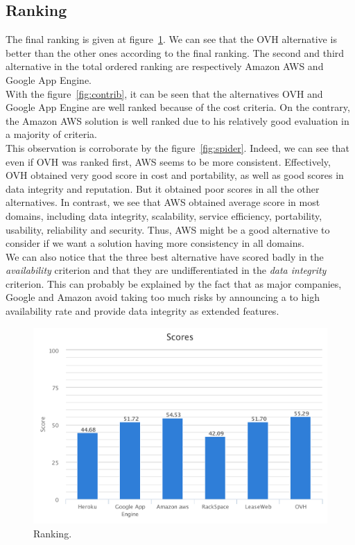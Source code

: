 \documentclass[a4paper,11pt]{article}
\begin{document}
\subsection{Ranking}
The final ranking is given at figure~\ref{fig:ranking}. We can see that the OVH alternative is better than the other ones according to the final ranking. The second and third alternative in the total ordered ranking are respectively Amazon AWS and Google App Engine.\\

With the figure~\ref{fig:contrib}, it can be seen that the alternatives OVH and Google App Engine are well ranked because of the cost criteria. On the contrary, the Amazon AWS solution is well ranked due to his relatively good evaluation in a majority of criteria.\\
This observation is corroborate by the figure~\ref{fig:spider}. Indeed, we can see that even if OVH was ranked first, AWS seems to be more consistent. Effectively, OVH obtained very good score in cost and portability, as well as good scores in data integrity and reputation. But it obtained poor scores in all the other alternatives. In contrast, we see that AWS obtained average score in most domains, including data integrity, scalability, service efficiency, portability, usability, reliability and security. Thus, AWS might be a good alternative to consider if we want a solution having more consistency in all domains.\\

We can also notice that the three best alternative have scored badly in the \emph{availability} criterion and that they are undifferentiated in the \emph{data integrity} criterion. This can probably be explained by the fact that as major companies, Google and Amazon avoid taking too much risks by announcing a to high availability rate and provide data integrity as extended features.\\

\begin{figure}[h]
  \center
  \includegraphics[width=\textwidth-5cm]{img/Result/ranking.pdf}
  \caption{Ranking.}
  \label{fig:ranking}
\end{figure}
\end{document}
